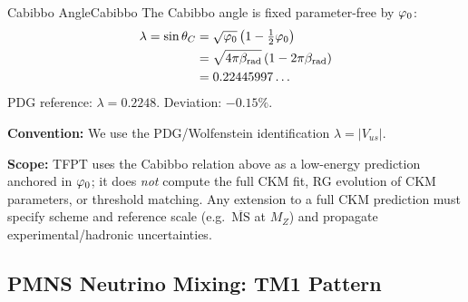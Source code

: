 \begin{corollary}{Cabibbo Angle}{Cabibbo}
The Cabibbo angle is fixed parameter-free by $\varphi_0$:
\begin{equation}
    \begin{aligned}
        \lambda = \sin\theta_C 
        &= \sqrt{\varphi_0}\left(1 - \tfrac{1}{2}\varphi_0\right) \\
        &= \sqrt{4\pi\beta_{\text{rad}}}\left(1 - 2\pi\beta_{\text{rad}}\right) \\
        &= 0.22445997\ldots
    \end{aligned}
\end{equation}
PDG reference: $\lambda = 0.2248$. Deviation: $-0.15\%$.
\end{corollary}

\begin{tcolorbox}[colback=gray!5, colframe=gray!60, 
    title={\textbf{CKM Conventions and Scale (Clarification)}}, fonttitle=\bfseries\small]
\textbf{Convention:} We use the PDG/Wolfenstein identification $\lambda = |V_{us}|$.

\textbf{Scope:} TFPT uses the Cabibbo relation above as a low-energy prediction anchored in $\varphi_0$; it does \emph{not} compute the full CKM fit, RG evolution of CKM parameters, or threshold matching.
Any extension to a full CKM prediction must specify scheme and reference scale (e.g.\ $\overline{\mathrm{MS}}$ at $M_Z$) and propagate experimental/hadronic uncertainties.
\end{tcolorbox}

\subsection{PMNS Neutrino Mixing: TM1 Pattern}

